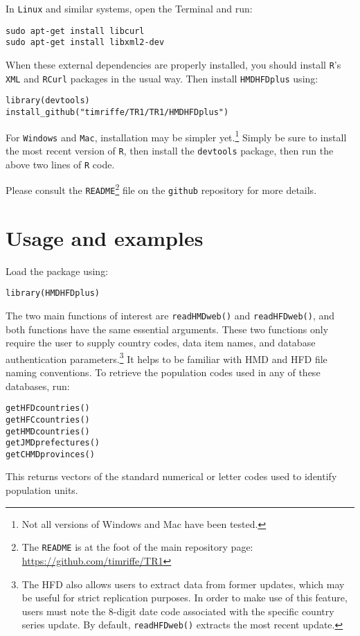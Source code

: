 \documentclass{article}
\begin{document}
In \texttt{Linux} and similar systems, open the Terminal and run:
\begin{verbatim}
sudo apt-get install libcurl
sudo apt-get install libxml2-dev
\end{verbatim}
When these external dependencies are properly installed, you should install
\texttt{R}'s \texttt{XML} and \texttt{RCurl} packages in the usual way. Then install \texttt{HMDHFDplus} using:
\begin{verbatim}
library(devtools)
install_github("timriffe/TR1/TR1/HMDHFDplus")
\end{verbatim}
For \texttt{Windows} and \texttt{Mac}, installation may be simpler
yet.\footnote{Not all versions of Windows and Mac have been tested.} Simply be sure to install the
most recent version of \texttt{R}, then install the \texttt{devtools} package,
then run the above two lines of \texttt{R} code.

Please consult the \texttt{README}\footnote{The \texttt{README} is at the
foot of the main repository
page: \url{https://github.com/timriffe/TR1}} file on the
\texttt{github} repository for more details. 

\section{Usage and examples}
Load the package using:
\begin{verbatim}
library(HMDHFDplus)
\end{verbatim}
The two main functions of interest are \texttt{readHMDweb()} and
\texttt{readHFDweb()}, and both functions have the same essential
arguments. These two functions only require the user to supply country codes,
data item names, and database authentication parameters.\footnote{The HFD also
allows users to extract data from former updates, which may be useful for
strict replication purposes. In order to make use of this feature, users must
note the 8-digit date code associated with the specific country series
update. By default, \texttt{readHFDweb()} extracts the most recent update.} It
helps to be familiar with HMD and HFD file naming conventions. To retrieve the population codes used in any of
these databases, run:
\begin{verbatim}
getHFDcountries()
getHFCcountries()
getHMDcountries()
getJMDprefectures()
getCHMDprovinces()
\end{verbatim}
This returns vectors of the standard numerical or letter codes used to identify
population units. 
\end{document}
